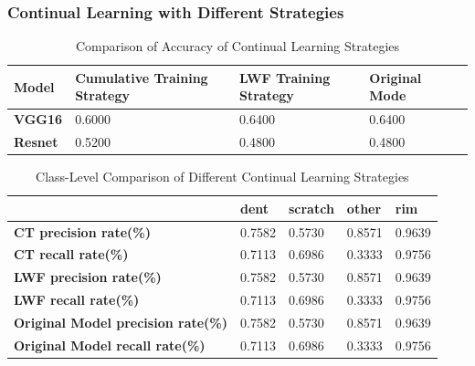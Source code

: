 \documentclass[lang=english,inputenc=utf8,fontsize=10pt]{ldvarticle}
\begin{document}
\subsubsection{Continual Learning with Different Strategies}
    \begin{table}[H]
    \begin{center}   
    \caption{Comparison of Accuracy of Continual Learning Strategies}  
    \label{Continual compaer} 
    \begin{tabular}{|m{2cm}<{\centering}|m{2cm}<{\centering}|m{2.0cm}<{\centering}|m{2cm}<{\centering}|m{2cm}<{\centering}|}   
    \hline   Model&\textbf{Cumulative Training Strategy} & \textbf{LWF Training Strategy} & \textbf{Original Mode}\\ 
    \hline   \textbf{VGG16}  & 0.6000 & 0.6400 & 0.6400\\ 
    \hline   \textbf{Resnet}  & 0.5200 & 0.4800 & 0.4800\\ 
    \hline 
    \end{tabular}   
    \end{center}   
    \end{table}
    
    \begin{table}[h]   
    \begin{center}   
    \caption{Class-Level Comparison of Different Continual Learning Strategies}  
    \label{Class-Level Comparison CL} 
    \begin{tabular}{|m{2cm}<{\centering}|m{2cm}<{\centering}|m{2.0cm}<{\centering}|m{2cm}<{\centering}|m{2cm}<{\centering}|}   
    \hline   &\textbf{dent} & \textbf{scratch} & \textbf{other} & \textbf{rim}\\ 
    \hline   \textbf{CT precision rate(\%)}  & 0.7582 & 0.5730 & 0.8571 & 0.9639  \\ 
    \hline   \textbf{CT recall rate(\%)} & 0.7113 & 0.6986 & 0.3333 & 0.9756   \\  
    \hline   \textbf{LWF precision rate(\%)}  & 0.7582 & 0.5730 & 0.8571 & 0.9639  \\ 
    \hline   \textbf{LWF recall rate(\%)} & 0.7113 & 0.6986 & 0.3333 & 0.9756   \\  
    \hline   \textbf{Original Model precision rate(\%)}  & 0.7582 & 0.5730 & 0.8571 & 0.9639  \\ 
    \hline   \textbf{Original Model recall rate(\%)} & 0.7113 & 0.6986 & 0.3333 & 0.9756   \\  
    \hline 
    \end{tabular}   
    \end{center}   
\end{table}
    
\end{document}
